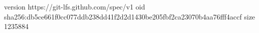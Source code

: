version https://git-lfs.github.com/spec/v1
oid sha256:db5ce661f0cc077ddb238dd41f2d2d1430be205fbf2ca23070b4aa76fff4accf
size 1235884
